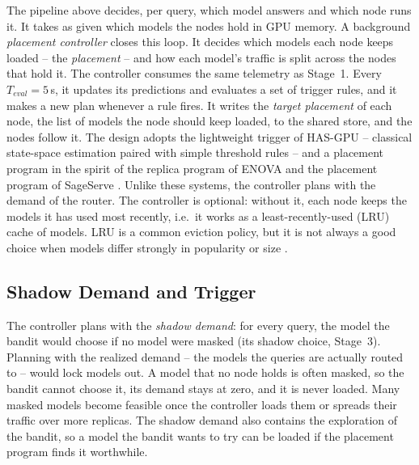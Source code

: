 The pipeline above decides, per query, which model answers and which node runs it.
It takes as given which models the nodes hold in GPU memory.
A background \emph{placement controller} closes this loop.
It decides which models each node keeps loaded -- the \emph{placement} -- and how each model's traffic is split across the nodes that hold it.
The controller consumes the same telemetry as Stage~1.
Every $T_{eval} = 5$\,s, it updates its predictions and evaluates a set of trigger rules, and it makes a new plan whenever a rule fires.
It writes the \emph{target placement} of each node, the list of models the node should keep loaded, to the shared store, and the nodes follow it.
The design adopts the lightweight trigger of HAS-GPU \cite{hasgpu} -- classical state-space estimation paired with simple threshold rules -- and a placement program in the spirit of the replica program of ENOVA \cite{enova} and the placement program of SageServe \cite{sageserve}.
Unlike these systems, the controller plans with the demand of the router.
The controller is optional: without it, each node keeps the models it has used most recently, i.e.\ it works as a least-recently-used (LRU) cache of models.
LRU is a common eviction policy, but it is not always a good choice when models differ strongly in popularity or size \cite{llm_serving_survey}.

\subsection{Shadow Demand and Trigger}

The controller plans with the \emph{shadow demand}: for every query, the model the bandit would choose if no model were masked (its shadow choice, Stage~3).
Planning with the realized demand -- the models the queries are actually routed to -- would lock models out.
A model that no node holds is often masked, so the bandit cannot choose it, its demand stays at zero, and it is never loaded.
Many masked models become feasible once the controller loads them or spreads their traffic over more replicas.
The shadow demand also contains the exploration of the bandit, so a model the bandit wants to try can be loaded if the placement program finds it worthwhile.

